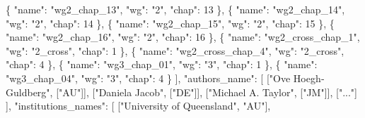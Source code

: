\documentclass[
]{article}
\newenvironment{Shaded}{}{}
\newcommand{\DataTypeTok}[1]{\textcolor[rgb]{0.56,0.13,0.00}{#1}}
\newcommand{\DecValTok}[1]{\textcolor[rgb]{0.25,0.63,0.44}{#1}}
\newcommand{\FunctionTok}[1]{\textcolor[rgb]{0.02,0.16,0.49}{#1}}
\newcommand{\OtherTok}[1]{\textcolor[rgb]{0.00,0.44,0.13}{#1}}
\newcommand{\StringTok}[1]{\textcolor[rgb]{0.25,0.44,0.63}{#1}}
\begin{document}
\begin{Shaded}
\begin{Highlighting}[]
    \FunctionTok{\{} \DataTypeTok{"name"}\FunctionTok{:} \StringTok{"wg2\_chap\_13"}\FunctionTok{,} \DataTypeTok{"wg"}\FunctionTok{:} \StringTok{"2"}\FunctionTok{,} \DataTypeTok{"chap"}\FunctionTok{:} \DecValTok{13} \FunctionTok{\}}\OtherTok{,}
    \FunctionTok{\{} \DataTypeTok{"name"}\FunctionTok{:} \StringTok{"wg2\_chap\_14"}\FunctionTok{,} \DataTypeTok{"wg"}\FunctionTok{:} \StringTok{"2"}\FunctionTok{,} \DataTypeTok{"chap"}\FunctionTok{:} \DecValTok{14} \FunctionTok{\}}\OtherTok{,}
    \FunctionTok{\{} \DataTypeTok{"name"}\FunctionTok{:} \StringTok{"wg2\_chap\_15"}\FunctionTok{,} \DataTypeTok{"wg"}\FunctionTok{:} \StringTok{"2"}\FunctionTok{,} \DataTypeTok{"chap"}\FunctionTok{:} \DecValTok{15} \FunctionTok{\}}\OtherTok{,}
    \FunctionTok{\{} \DataTypeTok{"name"}\FunctionTok{:} \StringTok{"wg2\_chap\_16"}\FunctionTok{,} \DataTypeTok{"wg"}\FunctionTok{:} \StringTok{"2"}\FunctionTok{,} \DataTypeTok{"chap"}\FunctionTok{:} \DecValTok{16} \FunctionTok{\}}\OtherTok{,}
    \FunctionTok{\{} \DataTypeTok{"name"}\FunctionTok{:} \StringTok{"wg2\_cross\_chap\_1"}\FunctionTok{,} \DataTypeTok{"wg"}\FunctionTok{:} \StringTok{"2\_cross"}\FunctionTok{,} \DataTypeTok{"chap"}\FunctionTok{:} \DecValTok{1} \FunctionTok{\}}\OtherTok{,}
    \FunctionTok{\{} \DataTypeTok{"name"}\FunctionTok{:} \StringTok{"wg2\_cross\_chap\_4"}\FunctionTok{,} \DataTypeTok{"wg"}\FunctionTok{:} \StringTok{"2\_cross"}\FunctionTok{,} \DataTypeTok{"chap"}\FunctionTok{:} \DecValTok{4} \FunctionTok{\}}\OtherTok{,}
    \FunctionTok{\{} \DataTypeTok{"name"}\FunctionTok{:} \StringTok{"wg3\_chap\_01"}\FunctionTok{,} \DataTypeTok{"wg"}\FunctionTok{:} \StringTok{"3"}\FunctionTok{,} \DataTypeTok{"chap"}\FunctionTok{:} \DecValTok{1} \FunctionTok{\}}\OtherTok{,}
    \FunctionTok{\{} \DataTypeTok{"name"}\FunctionTok{:} \StringTok{"wg3\_chap\_04"}\FunctionTok{,} \DataTypeTok{"wg"}\FunctionTok{:} \StringTok{"3"}\FunctionTok{,} \DataTypeTok{"chap"}\FunctionTok{:} \DecValTok{4} \FunctionTok{\}}
  \OtherTok{]}\FunctionTok{,}
  \DataTypeTok{"authors\_name"}\FunctionTok{:} \OtherTok{[}
    \OtherTok{[}\StringTok{"Ove Hoegh‐Guldberg"}\OtherTok{,} \OtherTok{[}\StringTok{"AU"}\OtherTok{]],}
    \OtherTok{[}\StringTok{"Daniela Jacob"}\OtherTok{,} \OtherTok{[}\StringTok{"DE"}\OtherTok{]],}
    \OtherTok{[}\StringTok{"Michael A. Taylor"}\OtherTok{,} \OtherTok{[}\StringTok{"JM"}\OtherTok{]],}
    \OtherTok{[}\StringTok{"..."}\OtherTok{]}
  \OtherTok{]}\FunctionTok{,}
  \DataTypeTok{"institutions\_names"}\FunctionTok{:} \OtherTok{[}
    \OtherTok{[}\StringTok{"University of Queensland"}\OtherTok{,} \StringTok{"AU"}\OtherTok{],}

\end{Highlighting}
\end{Shaded}
\end{document}
